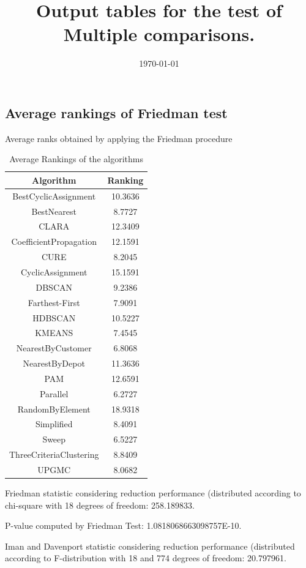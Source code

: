 \documentclass[a4paper,10pt]{article}
\title{Output tables for the test of Multiple comparisons.}
\author{}
\date{\today}
\begin{document}
\begin{landscape}
\pagestyle{empty}
\maketitle
\thispagestyle{empty}
\section{Average rankings of Friedman test}



Average ranks obtained by applying the Friedman procedure

\begin{table}[!htp]
\centering
\begin{tabular}{|c|c|}\hline
Algorithm&Ranking\\\hline
BestCyclicAssignment & 10.3636\\
BestNearest & 8.7727\\
CLARA & 12.3409\\
CoefficientPropagation & 12.1591\\
CURE & 8.2045\\
CyclicAssignment & 15.1591\\
DBSCAN & 9.2386\\
Farthest-First & 7.9091\\
HDBSCAN & 10.5227\\
KMEANS & 7.4545\\
NearestByCustomer & 6.8068\\
NearestByDepot & 11.3636\\
PAM & 12.6591\\
Parallel & 6.2727\\
RandomByElement & 18.9318\\
Simplified & 8.4091\\
Sweep & 6.5227\\
ThreeCriteriaClustering & 8.8409\\
UPGMC & 8.0682\\
\hline
\end{tabular}
\caption{Average Rankings of the algorithms}
\end{table}

Friedman statistic considering reduction performance (distributed according to chi-square with 18 degrees of freedom: 258.189833.

P-value computed by Friedman Test: 1.0818068663098757E-10.\newline

Iman and Davenport statistic considering reduction performance (distributed according to F-distribution with 18 and 774 degrees of freedom: 20.797961.


\end{landscape}
\end{document}
